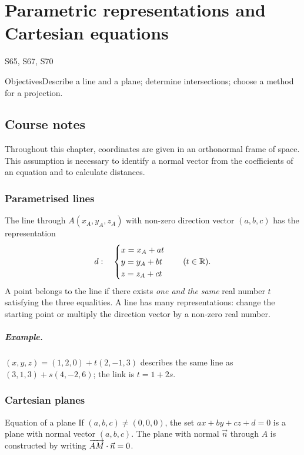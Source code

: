 \setcounter{chapter}{11}\chapter{Parametric representations and Cartesian equations}\label{ch:12}

{\small\sffamily\color{teal}S65, S67, S70\par}

\begin{retenir}{Objectives}Describe a line and a plane; determine intersections; choose a method for a projection.\end{retenir}

\section{Course notes}
Throughout this chapter, coordinates are given in an orthonormal frame of space. This assumption is necessary to identify a normal vector from the coefficients of an equation and to calculate distances.
\subsection{Parametrised lines}
The line through $A(x_A,y_A,z_A)$ with non-zero direction vector $(a,b,c)$ has the representation
\[d:\quad\begin{cases}x=x_A+at\\y=y_A+bt\\z=z_A+ct\end{cases}\quad(t\in\mathbb R).\]
A point belongs to the line if there exists \emph{one and the same} real number $t$ satisfying the three equalities. A line has many representations: change the starting point or multiply the direction vector by a non-zero real number.
\paragraph{Example.} $(x,y,z)=(1,2,0)+t(2,-1,3)$ describes the same line as $(3,1,3)+s(4,-2,6)$; the link is $t=1+2s$.
\subsection{Cartesian planes}
\begin{retenir}{Equation of a plane}
If $(a,b,c)\ne(0,0,0)$, the set $ax+by+cz+d=0$ is a plane with normal vector $(a,b,c)$. The plane with normal $\vec n$ through $A$ is constructed by writing $\overrightarrow{AM}\cdot\vec n=0$.
\end{retenir}
